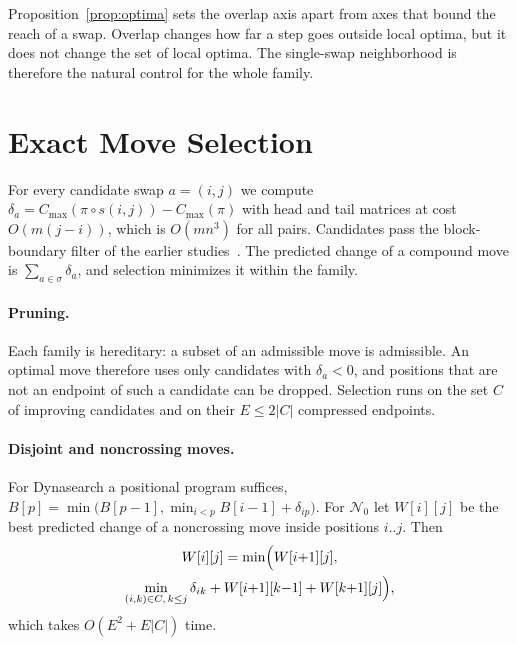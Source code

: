 \documentclass[10pt,twocolumn]{article}
\newcommand{\N}{\mathcal{N}}
\begin{document}
Proposition~\ref{prop:optima} sets the overlap axis apart from axes that
bound the reach of a swap. Overlap changes how far a step goes outside
local optima, but it does not change the set of local optima. The
single-swap neighborhood is therefore the natural control for the whole
family.

\section{Exact Move Selection}\label{sec:selection}

For every candidate swap $a=(i,j)$ we compute
$\delta_a=C_{\max}(\pi\circ s(i,j))-C_{\max}(\pi)$ with head and tail
matrices at cost $O(m(j-i))$, which is $O(mn^3)$ for all pairs.
Candidates pass the block-boundary filter of the earlier
studies~\cite{windowed_own}. The predicted change of a compound move is
$\sum_{a\in\sigma}\delta_a$, and selection minimizes it within the
family.

\paragraph{Pruning.} Each family is hereditary: a subset of an
admissible move is admissible. An optimal move therefore uses only
candidates with $\delta_a<0$, and positions that are not an endpoint of
such a candidate can be dropped. Selection runs on the set $C$ of
improving candidates and on their $E\leq 2|C|$ compressed endpoints.

\paragraph{Disjoint and noncrossing moves.} For Dynasearch a positional
program suffices,
$B[p]=\min\bigl(B[p-1],\min_{i<p}B[i-1]+\delta_{ip}\bigr)$. For $\N_0$
let $W[i][j]$ be the best predicted change of a noncrossing move inside
positions $i..j$. Then
\begin{multline}\label{eq:interval}
W[i][j]=\min\Bigl(W[i{+}1][j],\\ \min_{(i,k)\in C,\,k\leq j}
\delta_{ik}+W[i{+}1][k{-}1]+W[k{+}1][j]\Bigr),
\end{multline}
which takes $O(E^2+E|C|)$ time.
\end{document}

